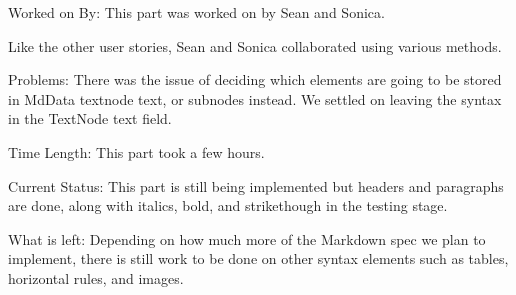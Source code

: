 Worked on By: This part was worked on by Sean and Sonica. 

Like the other user stories, Sean and Sonica collaborated using various methods.

Problems: There was the issue of deciding which elements are going to be stored in MdData textnode text, or subnodes instead. We settled on leaving the syntax in the TextNode text field.

Time Length: This part took a few hours. 

Current Status: This part is still being implemented but headers and paragraphs are done, along with italics, bold, and strikethough in the testing stage. 

What is left: Depending on how much more of the Markdown spec we plan to implement, there is still work to be done on other syntax elements such as tables, horizontal rules, and images. 
